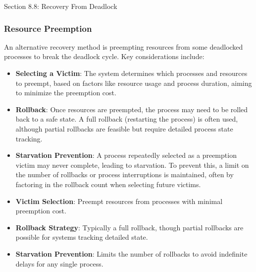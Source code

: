 \begin{notes}{Section 8.8: Recovery From Deadlock}
\begin{highlight}
    \end{highlight}
    
    \subsubsection*{Resource Preemption}
    
    An alternative recovery method is preempting resources from some deadlocked processes to break the deadlock cycle. Key considerations include:

    \begin{itemize}
        \item \textbf{Selecting a Victim}: The system determines which processes and resources to preempt, based on factors like resource usage and process duration, aiming to minimize the preemption cost.
        \item \textbf{Rollback}: Once resources are preempted, the process may need to be rolled back to a safe state. A full rollback (restarting the process) is often used, although partial rollbacks 
        are feasible but require detailed process state tracking.
        \item \textbf{Starvation Prevention}: A process repeatedly selected as a preemption victim may never complete, leading to starvation. To prevent this, a limit on the number of rollbacks or 
        process interruptions is maintained, often by factoring in the rollback count when selecting future victims.
    \end{itemize}
    
    \begin{highlight}
    
        \begin{itemize}
            \item \textbf{Victim Selection}: Preempt resources from processes with minimal preemption cost.
            \item \textbf{Rollback Strategy}: Typically a full rollback, though partial rollbacks are possible for systems tracking detailed state.
            \item \textbf{Starvation Prevention}: Limits the number of rollbacks to avoid indefinite delays for any single process.
        \end{itemize}
    
    \end{highlight}
    
    \begin{highlight}
    

\end{highlight}
\end{notes}

